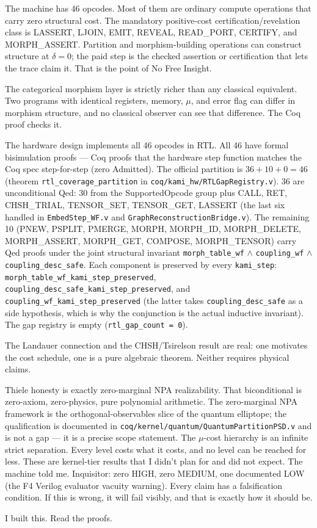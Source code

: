 \documentclass[11pt,a4paper]{article}
\theoremstyle{plain}
\theoremstyle{definition}
\theoremstyle{remark}
\begin{document}
The machine has 46 opcodes. Most of them are ordinary compute operations that carry zero structural cost. The mandatory positive-cost certification/revelation class is LASSERT, LJOIN, EMIT, REVEAL, READ\_PORT, CERTIFY, and MORPH\_ASSERT. Partition and morphism-building operations can construct structure at $\delta = 0$; the paid step is the checked assertion or certification that lets the trace claim it. That is the point of No Free Insight.

The categorical morphism layer is strictly richer than any classical equivalent. Two programs with identical registers, memory, $\mu$, and error flag can differ in morphism structure, and no classical observer can see that difference. The Coq proof checks it.

The hardware design implements all 46 opcodes in RTL. All 46 have formal bisimulation proofs --- Coq proofs that the hardware step function matches the Coq spec step-for-step (zero Admitted). The official partition is $36 + 10 + 0 = 46$ (theorem \texttt{rtl\_coverage\_partition} in \texttt{coq/kami\_hw/RTLGapRegistry.v}). 36 are unconditional Qed: 30 from the SupportedOpcode group plus CALL, RET, CHSH\_TRIAL, TENSOR\_SET, TENSOR\_GET, LASSERT (the last six handled in \texttt{EmbedStep\_WF.v} and \texttt{GraphReconstructionBridge.v}). The remaining 10 (PNEW, PSPLIT, PMERGE, MORPH, MORPH\_ID, MORPH\_DELETE, MORPH\_ASSERT, MORPH\_GET, COMPOSE, MORPH\_TENSOR) carry Qed proofs under the joint structural invariant \texttt{morph\_table\_wf} $\wedge$ \texttt{coupling\_wf} $\wedge$ \texttt{coupling\_desc\_safe}. Each component is preserved by every \texttt{kami\_step}: \texttt{morph\_table\_wf\_kami\_step\_preserved}, \texttt{coupling\_desc\_safe\_kami\_step\_preserved}, and \texttt{coupling\_wf\_kami\_step\_preserved} (the latter takes \texttt{coupling\_desc\_safe} as a side hypothesis, which is why the conjunction is the actual inductive invariant). The gap registry is empty (\texttt{rtl\_gap\_count = 0}).

The Landauer connection and the CHSH/Tsirelson result are real: one motivates the cost schedule, one is a pure algebraic theorem. Neither requires physical claims.

Thiele honesty is exactly zero-marginal NPA realizability. That biconditional is zero-axiom, zero-physics, pure polynomial arithmetic. The zero-marginal NPA framework is the orthogonal-observables slice of the quantum elliptope; the qualification is documented in \texttt{coq/kernel/quantum/QuantumPartitionPSD.v} and is not a gap — it is a precise scope statement. The $\mu$-cost hierarchy is an infinite strict separation. Every level costs what it costs, and no level can be reached for less. These are kernel-tier results that I didn't plan for and did not expect. The machine told me. Inquisitor: zero HIGH, zero MEDIUM, one documented LOW (the F4 Verilog evaluator vacuity warning). Every claim has a falsification condition. If this is wrong, it will fail visibly, and that is exactly how it should be.

I built this. Read the proofs.
\end{document}
